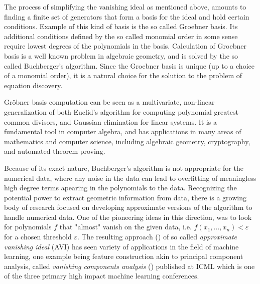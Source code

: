 \documentclass[runningheads]{llncs}
\begin{document}
The process of simplifying the vanishing ideal as mentioned above, 
amounts to finding a finite set of generators that form a basis for the ideal and
hold certain conditions. 
Example of this kind of basis is the so called Groebner basis.
Its additional conditions defined by the so called monomial order in some sense require lowest degrees of the polynomials in the basis.
Calculation of Groebner basis is a well known problem in algebraic geometry, and is solved by the so called Buchberger's algorithm.
Since the Groebner basis is unique (up to a choice of a monomial order), 
it is a natural choice for the solution to the problem of equation discovery.

Gröbner basis computation can be seen as a multivariate, non-linear generalization of
both Euclid's algorithm for computing polynomial greatest common divisors, 
and Gaussian elimination for linear systems.
It is a fundamental tool in computer algebra, and has applications in many areas of mathematics and computer science, including algebraic geometry, cryptography, and automated theorem proving.

Because of its exact nature, Buchberger's algorithm is not appropriate for the
numerical data, where any noise in the data can lead to overfitting of 
meaningless high degree terms apearing in the polynomials to the data.
Recognizing the potential power to extract geometric information from data, 
there is a growing body of research focused on developing approximate versions 
of the algorithm to handle numerical data.
One of the pioneering ideas in this direction, was to look for 
polynomials $f$ that "almost" vanish on the given data, 
i.e.
$f(x_1, ..., x_n) < \varepsilon$ for a chosen threshold $\varepsilon$.
The resulting approach (\cite{aviPokutta2009}) of so called 
\textsl{approximate vanishing ideal} (AVI) has seen 
variety of applications in the field of machine learning,
one example being feature construction akin to principal component analysis,
called \textsl{vanishing components analysis} (\cite{vca})
published at ICML which is one of the three primary high impact
machine learning conferences.
\end{document}
